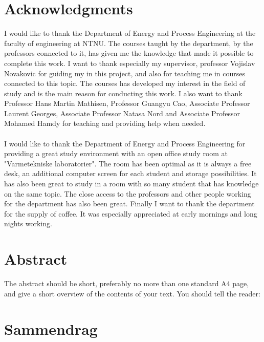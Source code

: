 \documentclass{report}
\begin{document}
\newpage

%
\chapter*{Acknowledgments}
I would like to thank the Department of Energy and Process Engineering at the faculty of engineering at NTNU. The courses taught by the department, by the professors connected to it, has given me the knowledge that made it possible to complete this work. I want to thank especially my supervisor, professor Vojislav Novakovic for guiding my in this project, and also for teaching me in courses connected to this topic. The courses has developed my interest in the field of study and is the main reason for conducting this work. I also want to thank Professor Hans Martin Mathisen, Professor Guangyu Cao, Associate Professor Laurent Georges, Associate Professor Natasa Nord and Associate Professor Mohamed Hamdy for teaching and providing help when needed. \\
\\
I would like to thank the Department of Energy and Process Engineering for providing a great study environment with an open office study room at "Varmetekniske laboratorier". The room has been optimal as it is always a free desk, an additional computer screen for each student and storage possibilities. It has also been great to study in a room with so many student that has knowledge on the same topic. The close access to the professors and other people working for the department has also been great. Finally I want to thank the department for the  supply of coffee. It was especially appreciated at early mornings and long nights working.
\newpage

\chapter*{Abstract}
The abstract should be short, preferably no more than one standard A4 page, and give a short overview of the contents of your text. You should tell the reader:



\newpage

\chapter*{Sammendrag}
\end{document}
